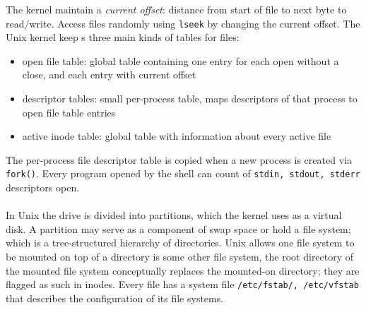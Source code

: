 \documentclass[twoside]{article}
\begin{document}
The kernel maintain a \emph{current offset}: distance from start of file to next byte to read/write. Access files randomly using \texttt{lseek} by changing the current offset. The Unix kernel keep s three main kinds of tables for files:
\begin{itemize}
\item open file table: global table containing one entry for each open without a close, and each entry with current offset
\item descriptor tables: small per-process table, maps descriptors of that process to open file table entries
\item active inode table: global table with information about every active file
\end{itemize}
The per-process file descriptor table is copied when a new process is created via \texttt{fork()}. Every program opened by the shell can count of \texttt{stdin, stdout, stderr} descriptors open.\\ \\
In Unix the drive is divided into partitions, which the kernel uses as a virtual disk. A partition may serve as a component of swap space or hold a file system; which is a tree-structured hierarchy of directories. Unix allows one file system to be mounted on top of a directory is some other file system, the root directory of the mounted file system conceptually replaces the mounted-on directory; they are flagged as such in inodes. Every file has a system file \texttt{/etc/fstab/, /etc/vfstab} that describes the configuration of its file systems.\\ \\
\end{document}
